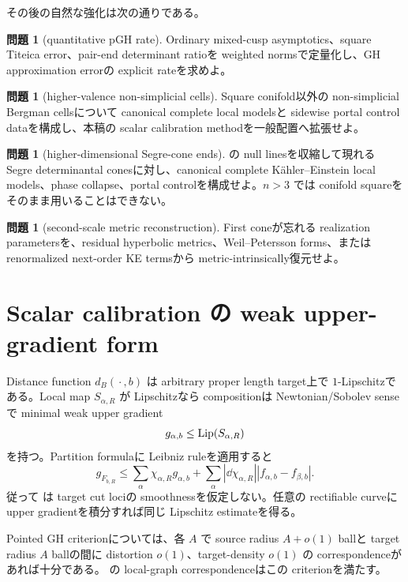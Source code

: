 \documentclass[11pt,a4paper]{ltjsarticle}
\theoremstyle{plain}
\theoremstyle{definition}
\newtheorem{problem}[theorem]{問題}\newtheorem{example}[theorem]{例}
\theoremstyle{remark}
\begin{document}
その後の自然な強化は次の通りである。
\begin{problem}[quantitative pGH rate]\label{prob:quantitative-rate}
Ordinary mixed-cusp asymptotics、square Titeica error、pair-end determinant ratioを weighted normsで定量化し、GH approximation errorの explicit rateを求めよ。
\end{problem}

\begin{problem}[higher-valence non-simplicial cells]\label{prob:higher-valence}
Square conifold以外の non-simplicial Bergman cellsについて canonical complete local modelsと sidewise portal control dataを構成し、本稿の scalar calibration methodを一般配置へ拡張せよ。
\end{problem}

\begin{problem}[higher-dimensional Segre-cone ends]\label{prob:higher-dimension}
 の null linesを収縮して現れる Segre determinantal conesに対し、canonical complete K\"ahler--Einstein local models、phase collapse、portal controlを構成せよ。$n>3$ では conifold squareをそのまま用いることはできない。
\end{problem}

\begin{problem}[second-scale metric reconstruction]\label{prob:second-scale}
First coneが忘れる realization parametersを、residual hyperbolic metrics、Weil--Petersson forms、または renormalized next-order KE termsから metric-intrinsically復元せよ。
\end{problem}

\appendix

\section{Scalar calibration の weak upper-gradient form}\label{app:weak-gradient}
Distance function $d_B(\,\boldsymbol\cdot\,,b)$ は arbitrary proper length target上で $1$-Lipschitzである。Local map $S_{\alpha,R}$ が Lipschitzなら compositionは Newtonian/Sobolev senseで minimal weak upper gradient
\[
 g_{\alpha,b}\le\operatorname{Lip}(S_{\alpha,R})
\]
を持つ。Partition formulaに Leibniz ruleを適用すると
\[
 g_{F_{b,R}}
 \le\sum_\alpha\chi_{\alpha,R}g_{\alpha,b}
 +\sum_\alpha|\dd\chi_{\alpha,R}|
  |f_{\alpha,b}-f_{\beta,b}|.
\]
従って  は target cut lociの smoothnessを仮定しない。任意の rectifiable curveに upper gradientを積分すれば同じ Lipschitz estimateを得る。

Pointed GH criterionについては、各 $A$ で source radius $A+o(1)$ ballと target radius $A$ ballの間に distortion $o(1)$、target-density $o(1)$ の correspondenceがあれば十分である。 の local-graph correspondenceはこの criterionを満たす。
\end{document}
